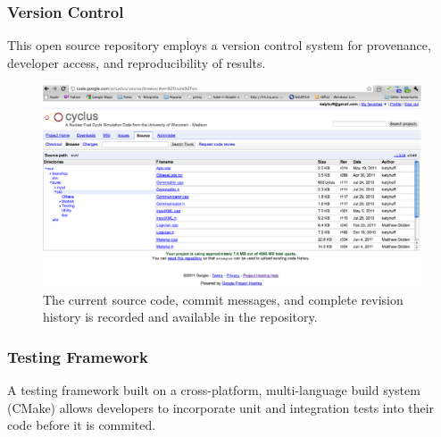 \begin{frame}[ctb!]
  \frametitle{Version Control}
    This open source repository employs a version control system 
     for provenance, developer access, and reproducibility of results.
  \begin{figure}[htbp!]
    \begin{center}
      \includegraphics[height=6cm]{source.eps}
    \end{center}
    \caption{The current source code, commit messages, and complete 
    revision history is recorded and available in the repository.}
    \label{fig:source}
  \end{figure}
\end{frame}
\begin{frame}[ctb!]
  \frametitle{Testing Framework}
  A testing framework built on a cross-platform, multi-language build 
  system (CMake) allows developers to incorporate unit and integration 
  tests into their code before it is commited.
\end{frame}
